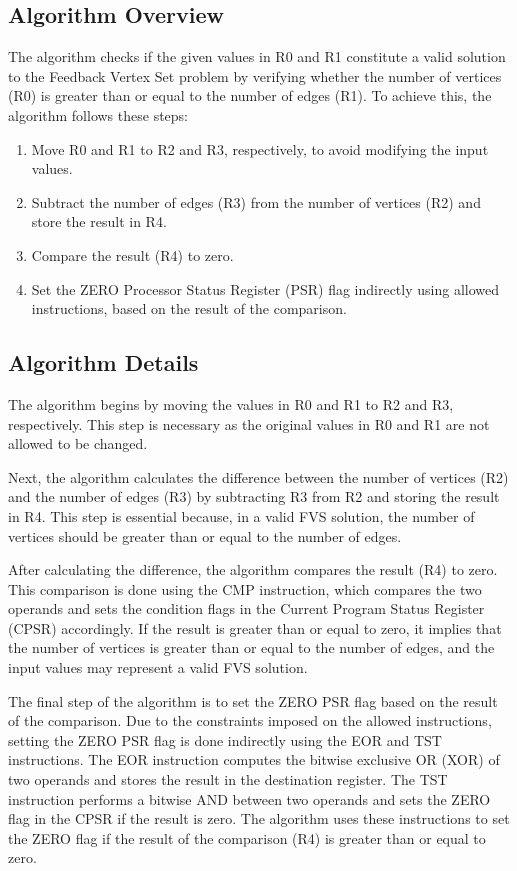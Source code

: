 \subsection{Algorithm Overview}

The algorithm checks if the given values in R0 and R1 constitute a valid solution to the Feedback Vertex Set problem by verifying whether the number of vertices (R0) is greater than or equal to the number of edges (R1). To achieve this, the algorithm follows these steps:

\begin{enumerate}
    \item Move R0 and R1 to R2 and R3, respectively, to avoid modifying the input values.
    \item Subtract the number of edges (R3) from the number of vertices (R2) and store the result in R4.
    \item Compare the result (R4) to zero.
    \item Set the ZERO Processor Status Register (PSR) flag indirectly using allowed instructions, based on the result of the comparison.
\end{enumerate}

\subsection{Algorithm Details}

The algorithm begins by moving the values in R0 and R1 to R2 and R3, respectively. This step is necessary as the original values in R0 and R1 are not allowed to be changed.

Next, the algorithm calculates the difference between the number of vertices (R2) and the number of edges (R3) by subtracting R3 from R2 and storing the result in R4. This step is essential because, in a valid FVS solution, the number of vertices should be greater than or equal to the number of edges.

After calculating the difference, the algorithm compares the result (R4) to zero. This comparison is done using the CMP instruction, which compares the two operands and sets the condition flags in the Current Program Status Register (CPSR) accordingly. If the result is greater than or equal to zero, it implies that the number of vertices is greater than or equal to the number of edges, and the input values may represent a valid FVS solution.

The final step of the algorithm is to set the ZERO PSR flag based on the result of the comparison. Due to the constraints imposed on the allowed instructions, setting the ZERO PSR flag is done indirectly using the EOR and TST instructions. The EOR instruction computes the bitwise exclusive OR (XOR) of two operands and stores the result in the destination register. The TST instruction performs a bitwise AND between two operands and sets the ZERO flag in the CPSR if the result is zero. The algorithm uses these instructions to set the ZERO flag if the result of the comparison (R4) is greater than or equal to zero.

